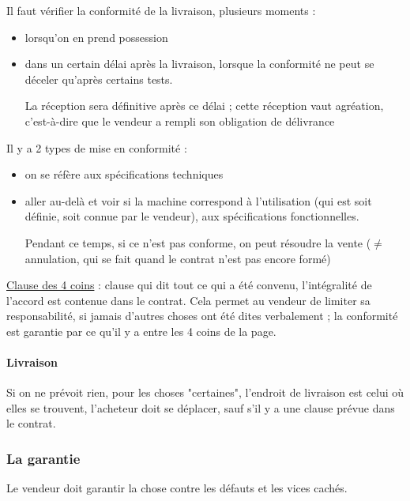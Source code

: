 				Il faut vérifier la conformité de la livraison, plusieurs moments :
		
				\begin{itemize}
					\item lorsqu'on en prend possession
					\item dans un certain délai après la livraison, lorsque la conformité ne peut se déceler qu'après certains tests.
				
					La réception sera définitive après ce délai ; cette réception vaut agréation, c'est-à-dire que le vendeur a rempli son obligation de délivrance
				\end{itemize}
				
			
		
				Il y a 2 types de mise en conformité :
		
				\begin{itemize}
					\item on se réfère aux spécifications techniques
					\item aller au-delà et voir si la machine correspond à l'utilisation (qui est soit définie, soit connue par le vendeur), aux spécifications fonctionnelles.
					
					Pendant ce temps, si ce n'est pas conforme, on peut résoudre la vente ($\neq$ annulation, qui se fait quand le contrat n'est pas encore formé)	
				\end{itemize}
		
				\underline{Clause des 4 coins} : clause qui dit tout ce qui a été convenu, l'intégralité de l'accord est contenue dans le contrat. Cela permet au vendeur de limiter sa responsabilité, si jamais d'autres choses ont été dites verbalement ; la conformité est garantie par ce qu'il y a entre les 4 coins de la page.
				
				\paragraph{Livraison}
		
			Si on ne prévoit rien, pour les choses "certaines", l'endroit de livraison est celui où elles se trouvent, l'acheteur doit se déplacer, sauf s'il y a une clause prévue dans le contrat.
		
		\subsubsection{La garantie}
		
		Le vendeur doit garantir la chose contre les défauts et les vices cachés. 
		
